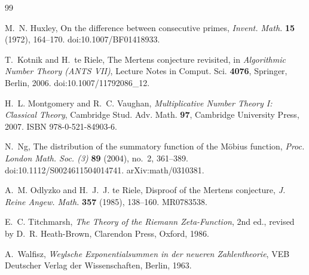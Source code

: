 \documentclass[11pt]{amsart}
\numberwithin{equation}{section}
\theoremstyle{plain}
\theoremstyle{definition}
\theoremstyle{remark}
\begin{document}
\begin{thebibliography}{99}

M.~N. Huxley, On the difference between consecutive primes,
\emph{Invent. Math.} \textbf{15} (1972), 164--170.
doi:10.1007/BF01418933.

T.~Kotnik and H.~te Riele, The Mertens conjecture revisited, in
\emph{Algorithmic Number Theory (ANTS VII)}, Lecture Notes in Comput. Sci.
\textbf{4076}, Springer, Berlin, 2006. doi:10.1007/11792086\_12.

H.~L. Montgomery and R.~C. Vaughan, \emph{Multiplicative Number Theory I:
Classical Theory}, Cambridge Stud. Adv. Math. \textbf{97}, Cambridge
University Press, 2007. ISBN 978-0-521-84903-6.

N.~Ng, The distribution of the summatory function of the Möbius function,
\emph{Proc. London Math. Soc. (3)} \textbf{89} (2004), no.~2, 361--389.
doi:10.1112/S0024611504014741. arXiv:math/0310381.

A.~M. Odlyzko and H.~J.~J. te Riele, Disproof of the Mertens conjecture,
\emph{J. Reine Angew. Math.} \textbf{357} (1985), 138--160. MR0783538.

E.~C. Titchmarsh, \emph{The Theory of the Riemann Zeta-Function}, 2nd ed.,
revised by D.~R. Heath-Brown, Clarendon Press, Oxford, 1986.

A.~Walfisz, \emph{Weylsche Exponentialsummen in der neueren Zahlentheorie},
VEB Deutscher Verlag der Wissenschaften, Berlin, 1963.

\end{thebibliography}
\end{document}
